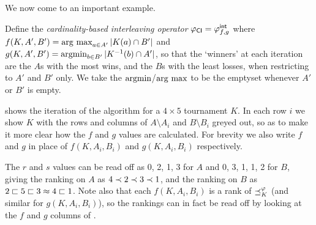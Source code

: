 We now come to an important example.

\begin{example}
    \label{tourn_ex_cardint}

    Define the \emph{cardinality-based interleaving operator} ${\varphi_{\mathsf{CI}}} =
    {\varphi_{f,g}^\mathsf{int}}$ where $f(K, A', B') = \operatorname*{arg\ max}_{a \in A'}{|K(a) \cap B'|}$ and
    \\  %
    $g(K, A', B') = \operatorname{argmin}_{b \in B'}{|K^{-1}(b) \cap A'|}$, so that the
    `winners' at each iteration are the $A$s with the most wins, and the $B$s
    with the least losses, when restricting to $A'$ and $B'$ only.  We take the
    $\operatorname{argmin}$/$\operatorname*{arg\ max}$ to be the emptyset whenever $A'$ or $B'$ is empty.

     shows the iteration of the algorithm for a $4
    \times 5$ tournament $K$. In each row $i$ we show $K$ with the rows and
    columns of $A \setminus A_i$ and $B \setminus B_i$ greyed out, so as to
    make it more clear how the $f$ and $g$ values are
    calculated.\footnotemark{} For brevity we also write $f$ and $g$ in place
    of $f(K, A_i, B_i)$ and $g(K, A_i, B_i)$ respectively.

    The $r$ and $s$ values can be read off as 0, 2, 1, 3 for $A$ and 0, 3, 1,
    1, 2 for $B$, giving the ranking on $A$ as $4 \prec 2 \prec 3 \prec 1$, and
    the ranking on $B$ as $2 \sqsubset 5 \sqsubset 3 \approx 4 \sqsubset 1$. Note also that each
    $f(K, A_i, B_i)$ is a rank of $\preceq_K^\varphi$ (and similar for $g(K, A_i,
    B_i)$), so the rankings can in fact be read off by looking at the $f$ and
    $g$ columns of .


\end{example}

